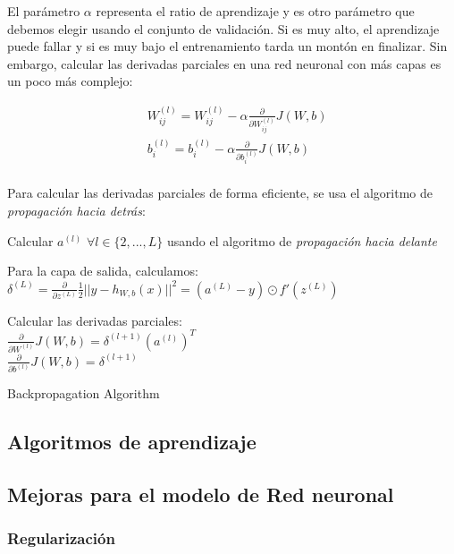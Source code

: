 El parámetro $\alpha$ representa el ratio de aprendizaje y es otro parámetro que debemos elegir usando el conjunto de validación. Si es muy alto, el aprendizaje puede fallar y si es muy bajo el entrenamiento tarda un montón en finalizar. Sin embargo, calcular las derivadas parciales en una red neuronal con más capas es un poco más complejo:

\begin{align*}
	&W^{(l)}_{ij} = W^{(l)}_{ij} - \alpha \frac{\partial}{\partial W^{(l)}_{ij}} J(W,b)\\
	&b^{(l)}_i = b^{(l)}_i - \alpha \frac{\partial}{\partial b^{(l)}_i} J(W,b)\\
\end{align*}

Para calcular las derivadas parciales de forma eficiente, se usa el algoritmo de \textit{propagación hacia detrás}:\\

\begin{algorithm}[H]
	\SetAlgoLined
	
	Calcular $a^{(l)}$ $\forall l \in \{2, ..., L\}$ usando el algoritmo de \textit{propagación hacia delante}
	
	Para la capa de salida, calculamos: $\delta^{(L)} = \frac{\partial}{\partial z^{(L)}} \frac{1}{2} || y - h_{W,b}(x) ||^2 = (a^{(L)}- y) \odot f'(z^{(L)})$
	
	
	Calcular las derivadas parciales:\\
	\nonl $\frac{\partial}{\partial W^{(l)}} J(W,b) = \delta^{(l+1)}(a^{(l)})^T$\\
	\nonl $\frac{\partial}{\partial b^{(l)}} J(W,b) = \delta^{(l+1)}$
	
	\caption{Backpropagation Algorithm}
\end{algorithm}

\subsection{Algoritmos de aprendizaje}

\subsection{Mejoras para el modelo de Red neuronal}

\subsubsection{Regularización}

